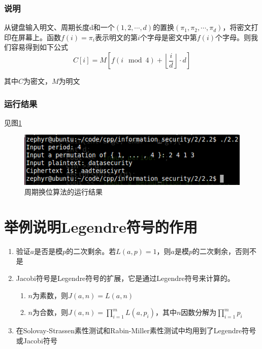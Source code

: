 \documentclass[11pt]{article}
\begin{document}
\subsubsection{说明}
从键盘输入明文、周期长度d和一个$(1, 2, \cdots , d)$的置换$(\pi_1, \pi_2, \cdots, \pi_{d})$，将密文打印在屏幕上。函数$f(i)=\pi_i$表示明文的第$i$个字母是密文中第$f(i)$个字母。则我们容易得到如下公式
\[ C[i] = M\left[ f\left( i \mod 4 \right) + \left \lfloor \dfrac{i}{d} \right \rfloor \cdot d \right] \]

其中$C$为密文，$M$为明文

\subsubsection{运行结果}
见图\ref{fig: rlt3}
\begin{center}
\begin{figure}[htbp]
\includegraphics[width=\textwidth]{2.2.png}
\caption{周期换位算法的运行结果}
\label{fig: rlt3}
\end{figure}
\end{center}

\section{举例说明Legendre符号的作用}
\begin{enumerate}
\item 验证$a$是否是模$p$的二次剩余。若$L(a, p)=1$，则$a$是模$p$的二次剩余，否则不是
\item Jacobi符号是Legendre符号的扩展，它是通过Legendre符号来计算的。\\
\begin{enumerate}
\item $n$为素数，则$J(a, n)=L(a, n)$
\item $n$为合数，则$J(a, n)=\prod_{i = 1}^m L(a, p_i)$，其中$n$因数分解为$\prod_{i = 1}^m p_i$
\end{enumerate}
\item 在Solovay-Strassen素性测试和Rabin-Miller素性测试中均用到了Legendre符号或Jacobi符号
\end{enumerate}
\end{document}
